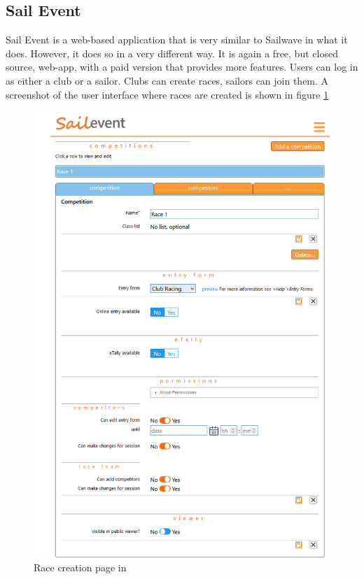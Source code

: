 \documentclass{l4proj}
\begin{document}
\subsection{Sail Event}

Sail Event \citet{SailEvent} is a web-based application that is very similar to Sailwave in what it does. However, it does so in a very different way. It is again a free, but closed source, web-app, with a paid version that provides more features. Users can log in as either a club or a sailor. Clubs can create races, sailors can join them. A screenshot of the user interface where races are created is shown in figure \ref{fig:sailEvent}

\begin{figure}[H]
    \centering
    \includegraphics[width=1\linewidth]{images/Sailevent.png} 

    \caption{Race creation page in \citet{SailEvent}
    }

    \label{fig:sailEvent}
\end{figure}
\end{document}
